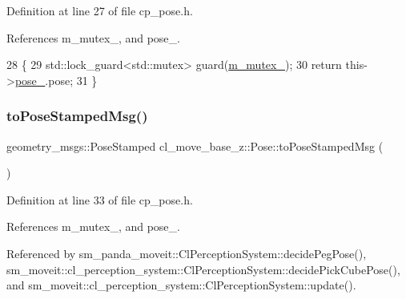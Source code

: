 Definition at line 27 of file cp\+\_\+pose.\+h.



References m\+\_\+mutex\+\_\+, and pose\+\_\+.


\begin{DoxyCode}
28     \{
29         std::lock\_guard<std::mutex> guard(\hyperlink{classcl__move__base__z_1_1Pose_a73ed2daba3e473e156cab751fb37b58f}{m\_mutex\_});
30         \textcolor{keywordflow}{return} this->\hyperlink{classcl__move__base__z_1_1Pose_a9da7acf880968a3c220b8436fd0bb6ef}{pose\_}.pose;
31     \}
\end{DoxyCode}
\mbox{\label{classcl__move__base__z_1_1Pose_a63887a88c1ac6e9a4a71b8d7d11aed6c}} 
\subsubsection{\texorpdfstring{to\+Pose\+Stamped\+Msg()}{toPoseStampedMsg()}}
{\footnotesize\ttfamily geometry\+\_\+msgs\+::\+Pose\+Stamped cl\+\_\+move\+\_\+base\+\_\+z\+::\+Pose\+::to\+Pose\+Stamped\+Msg (\begin{DoxyParamCaption}{ }\end{DoxyParamCaption})\hspace{0.3cm}{\ttfamily [inline]}}



Definition at line 33 of file cp\+\_\+pose.\+h.



References m\+\_\+mutex\+\_\+, and pose\+\_\+.



Referenced by sm\+\_\+panda\+\_\+moveit\+::\+Cl\+Perception\+System\+::decide\+Peg\+Pose(), sm\+\_\+moveit\+::cl\+\_\+perception\+\_\+system\+::\+Cl\+Perception\+System\+::decide\+Pick\+Cube\+Pose(), and sm\+\_\+moveit\+::cl\+\_\+perception\+\_\+system\+::\+Cl\+Perception\+System\+::update().


